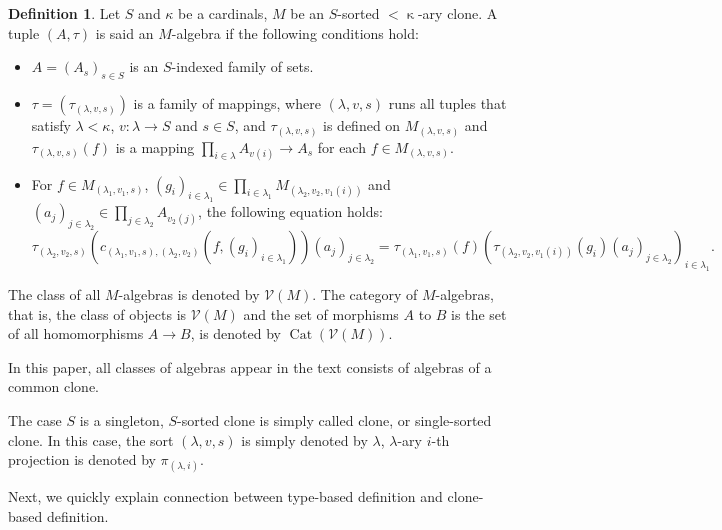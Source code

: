 \documentclass[a4paper,10pt]{article}
\theoremstyle{definition}
\newtheorem{df}{Definition}[section]
\newcommand\ra{\rightarrow}
\newcommand\mc{\mathclose}
\newcommand\V{\mathcal{V}}
\DeclareMathOperator{\Cat}{Cat}
\begin{document}
\begin{df}
Let $S$ and $\kappa$ be a cardinals, $M$ be an $S$-sorted $<\mc\kappa$-ary clone.
A tuple $(A,\tau)$ is said an $M$-algebra if the following conditions hold:
\begin{itemize}
\item
$A=(A_s)_{s\in S}$ is an $S$-indexed family of sets.
\item
$\tau=(\tau_{(\lambda,v,s)})$ is a family of mappings, where $(\lambda,v,s)$ runs
all tuples that satisfy $\lambda<\kappa$, $v:\lambda \ra S$ and $s\in S$,
and $\tau_{(\lambda,v,s)}$ is defined on $M_{(\lambda,v,s)}$ and
$\tau_{(\lambda,v,s)}(f)$ is a mapping $\prod_{i\in\lambda}A_{v(i)}\ra A_s$
for each $f\in M_{(\lambda,v,s)}$.
\item
For $f\in M_{(\lambda_1,v_1,s)}$,
$(g_i)_{i\in\lambda_1}\in \prod_{i\in\lambda_1}M_{(\lambda_2,v_2,v_1(i))}$
and $(a_j)_{j\in\lambda_2}\in\prod_{j\in\lambda_2}A_{v_2(j)}$,
the following equation holds:
\[
\tau_{(\lambda_2,v_2,s)}(c_{(\lambda_1,v_1,s),(\lambda_2,v_2)}(f,(g_i)_{i\in\lambda_1}))(a_{j})_{j\in\lambda_2}
=\tau_{(\lambda_1,v_1,s)}(f)(\tau_{(\lambda_2,v_2,v_1(i))}(g_i)(a_j)_{j\in\lambda_2})_{i\in\lambda_1}.
\]
\end{itemize}
The class of all $M$-algebras is denoted by $\V(M)$.
The category of $M$-algebras, that is, the class of objects is $\V(M)$
and the set of morphisms $A$ to $B$ is the set of all homomorphisms $A\ra B$,
is denoted by $\Cat(\V(M))$.
\end{df}

In this paper, all classes of algebras appear in the text consists of algebras of a common clone.

The case $S$ is a singleton, $S$-sorted clone is simply called clone,
or single-sorted clone. In this case, the sort $(\lambda,v,s)$ is
simply denoted by $\lambda$, $\lambda$-ary $i$-th projection is
denoted by $\pi_{(\lambda,i)}$.

Next, we quickly explain connection between type-based
definition and clone-based definition.
\end{document}
